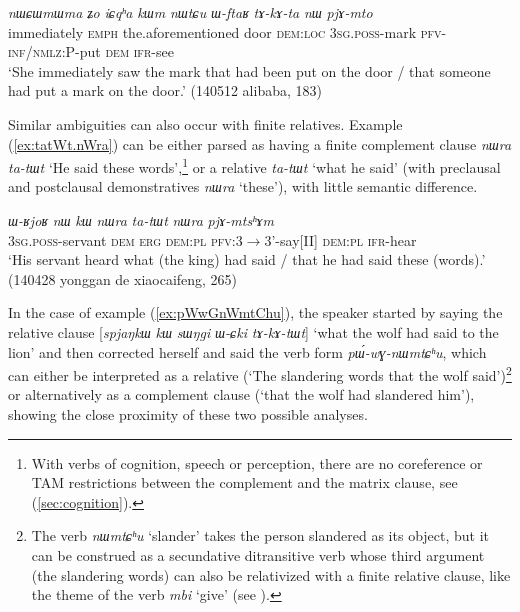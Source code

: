 \documentclass[oneside,a4paper,11pt]{article}
\newcommand{\ipa}[1]{\textit{\phon#1}}
\newcommand{\jpg}[2]{\ipa{#1} `#2'}
\begin{document}
\begin{exe}
\ex  \label{ex:WftaR.tAkAta}
\gll 
\ipa{nɯɕɯmɯma} 	\ipa{ʑo} 	\ipa{iɕqʰa} 	\ipa{kɯm} 	\ipa{nɯtɕu} 	\ipa{ɯ-ftaʁ} 	\ipa{tɤ-kɤ-ta} 	\ipa{nɯ} 	\ipa{pjɤ-mto} \\
immediately \textsc{emph} the.aforementioned door \textsc{dem:loc} \textsc{3sg.poss}-mark \textsc{pfv-inf/nmlz:P}-put \textsc{dem} \textsc{ifr}-see \\
\glt `She immediately saw the mark that had been put on the door / that someone had put a mark on the door.' (140512 alibaba, 183)
\end{exe}

Similar ambiguities can also occur with finite relatives. Example (\ref{ex:tatWt.nWra}) can be either parsed as having a finite complement clause \ipa{nɯra} 	\ipa{ta-tɯt} `He said these words',\footnote{With verbs of cognition, speech or perception, there are no coreference or TAM restrictions between the complement and the matrix clause, see (\ref{sec:cognition}).} or a relative \ipa{ta-tɯt} `what he said' (with preclausal and postclausal demonstratives \ipa{nɯra} `these'), with little semantic difference.

\begin{exe}
\ex \label{ex:tatWt.nWra}
\gll \ipa{ɯ-ʁjoʁ} 	\ipa{nɯ} 	\ipa{kɯ} 	\ipa{nɯra} 	\ipa{ta-tɯt} 	\ipa{nɯra} 	\ipa{pjɤ-mtsʰɤm} \\
\textsc{3sg.poss}-servant \textsc{dem} \textsc{erg} \textsc{dem:pl} \textsc{pfv}:3$\rightarrow$3'-say[II] \textsc{dem:pl}  \textsc{ifr}-hear \\
\glt `His servant heard what (the king) had said / that he had said these (words).' (140428 yonggan de xiaocaifeng, 265)
\end{exe}

In the case of example (\ref{ex:pWwGnWmtChu}), the speaker started by saying the relative clause [\ipa{spjaŋkɯ} \ipa{kɯ} \ipa{sɯŋgi} \ipa{ɯ-ɕki} \ipa{tɤ-kɤ-tɯt}] `what the wolf had said to the lion' and then corrected herself and said the verb form \ipa{pɯ́-wɣ-nɯmtɕʰu}, which can either be interpreted as a relative (`The slandering words that the wolf said')\footnote{The verb \jpg{nɯmtɕʰu}{slander} takes the person slandered as its object, but it can be construed as a secundative ditransitive verb whose third argument (the slandering words) can also be relativized with a finite relative clause, like the theme of the verb \jpg{mbi}{give} (see \citealt[16-17]{jacques16relatives}).} or alternatively as a complement clause (`that the wolf had slandered him'), showing the close proximity of these two possible analyses.
\end{document}
